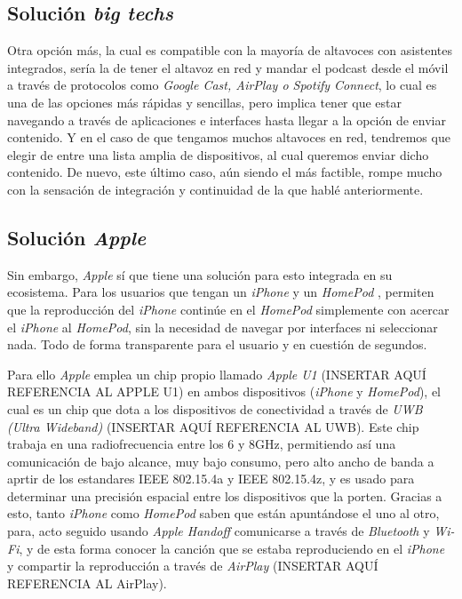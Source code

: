 \subsection{Solución \emph{big techs}}
Otra opción más, la cual es compatible con la mayoría de altavoces con
asistentes integrados, sería la de tener el altavoz en red y mandar el podcast
desde el móvil a través de protocolos como \emph{Google Cast, AirPlay o Spotify
Connect}, lo cual es una de las opciones más rápidas y sencillas, pero implica
tener que estar navegando a través de aplicaciones e interfaces hasta llegar a
la opción de enviar contenido. Y en el caso de que tengamos muchos altavoces en
red, tendremos que elegir de entre una lista amplia de dispositivos, al cual
queremos enviar dicho contenido. De nuevo, este último caso, aún siendo el más
factible, rompe mucho con la sensación de integración y continuidad de la que
hablé anteriormente. 

\subsection{Solución \emph{Apple}} Sin embargo, \emph{Apple} sí que tiene una
solución para esto integrada en su ecosistema. Para los usuarios que tengan un
\emph{iPhone} y un \emph{HomePod} \cite{HomePod}, permiten que la reproducción
del \emph{iPhone} continúe en el \emph{HomePod} simplemente con acercar el
\emph{iPhone} al \emph{HomePod}, sin la necesidad de navegar por interfaces ni
seleccionar nada. Todo de forma transparente para el usuario y en cuestión de
segundos. 

Para ello \emph{Apple} emplea un chip propio llamado \emph{Apple U1} (INSERTAR
AQUÍ REFERENCIA AL APPLE U1) en ambos dispositivos (\emph{iPhone} y
\emph{HomePod}), el cual es un chip que dota a los dispositivos de conectividad
a través de \emph{UWB (Ultra Wideband)} (INSERTAR AQUÍ REFERENCIA AL UWB). Este
chip trabaja en una radiofrecuencia entre los 6 y 8GHz, permitiendo así una
comunicación de bajo alcance, muy bajo consumo, pero alto ancho de banda a
aprtir de los estandares IEEE 802.15.4a y IEEE 802.15.4z, y es usado para
determinar una precisión espacial entre los dispositivos que la porten. Gracias
a esto, tanto \emph{iPhone} como \emph{HomePod} saben que están apuntándose el
uno al otro, para, acto seguido usando \emph{Apple Handoff} comunicarse a través
de \emph{Bluetooth} y \emph{Wi-Fi}, y de esta forma conocer la canción que se
estaba reproduciendo en el \emph{iPhone} y compartir la reproducción a través de
\emph{AirPlay} (INSERTAR AQUÍ REFERENCIA AL AirPlay).

